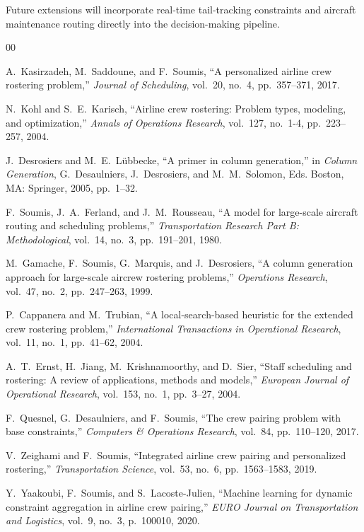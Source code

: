 \documentclass[journal]{IEEEtran}
\begin{document}
Future extensions will incorporate real-time tail-tracking constraints and aircraft maintenance routing directly into the decision-making pipeline.

\balance

\begin{thebibliography}{00}

A.~Kasirzadeh, M.~Saddoune, and F.~Soumis, ``A personalized airline crew rostering problem,'' \emph{Journal of Scheduling}, vol.~20, no.~4, pp.~357--371, 2017.

N.~Kohl and S.~E.~Karisch, ``Airline crew rostering: Problem types, modeling, and optimization,'' \emph{Annals of Operations Research}, vol.~127, no.~1-4, pp.~223--257, 2004.

J.~Desrosiers and M.~E.~L{\"u}bbecke, ``A primer in column generation,'' in \emph{Column Generation}, G.~Desaulniers, J.~Desrosiers, and M.~M.~Solomon, Eds. Boston, MA: Springer, 2005, pp.~1--32.

F.~Soumis, J.~A.~Ferland, and J.~M.~Rousseau, ``A model for large-scale aircraft routing and scheduling problems,'' \emph{Transportation Research Part B: Methodological}, vol.~14, no.~3, pp.~191--201, 1980.

M.~Gamache, F.~Soumis, G.~Marquis, and J.~Desrosiers, ``A column generation approach for large-scale aircrew rostering problems,'' \emph{Operations Research}, vol.~47, no.~2, pp.~247--263, 1999.

P.~Cappanera and M.~Trubian, ``A local-search-based heuristic for the extended crew rostering problem,'' \emph{International Transactions in Operational Research}, vol.~11, no.~1, pp.~41--62, 2004.

A.~T.~Ernst, H.~Jiang, M.~Krishnamoorthy, and D.~Sier, ``Staff scheduling and rostering: A review of applications, methods and models,'' \emph{European Journal of Operational Research}, vol.~153, no.~1, pp.~3--27, 2004.

F.~Quesnel, G.~Desaulniers, and F.~Soumis, ``The crew pairing problem with base constraints,'' \emph{Computers \& Operations Research}, vol.~84, pp.~110--120, 2017.

V.~Zeighami and F.~Soumis, ``Integrated airline crew pairing and personalized rostering,'' \emph{Transportation Science}, vol.~53, no.~6, pp.~1563--1583, 2019.

Y.~Yaakoubi, F.~Soumis, and S.~Lacoste-Julien, ``Machine learning for dynamic constraint aggregation in airline crew pairing,'' \emph{EURO Journal on Transportation and Logistics}, vol.~9, no.~3, p.~100010, 2020.


\end{thebibliography}
\end{document}
